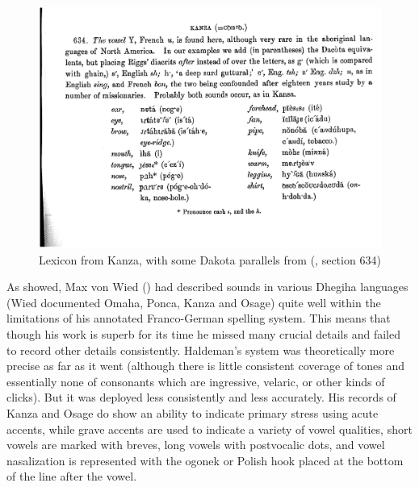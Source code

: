\documentclass[output=paper]{LSP/langsci}
\begin{document}
\begin{figure}
\centering
\caption{Lexicon from Kanza, with some Dakota parallels from \citet{Riggs1852}  (\citealt[3]{Haldeman1860}, section 634)} \label{haldemanlexicon}
\includegraphics[width=5in]{figures/GrantKanzaWords}
\end{figure}

As \citet{Rankin1994} showed, Max von Wied (\citeyear{Maximilian18391841}) had described sounds in various Dhegiha languages (Wied documented Omaha, Ponca, Kanza and Osage) quite well within the limitations of his annotated Franco-German spelling system. This means that though his work is superb for its time he missed many crucial details and failed to record other details consistently.   Haldeman's system was theoretically more precise as far as it went (although there is little consistent coverage of tones and essentially none of consonants which are ingressive, velaric, or other kinds of clicks). But it was deployed less consistently and less accurately.   His records of Kanza and Osage do show an ability to indicate primary stress using acute accents, while grave accents are used to indicate a variety of vowel qualities, short vowels are marked with breves, long vowels with postvocalic dots, and vowel nasalization is represented with the ogonek or Polish hook placed at the bottom of the line after the vowel.  
\end{document}
